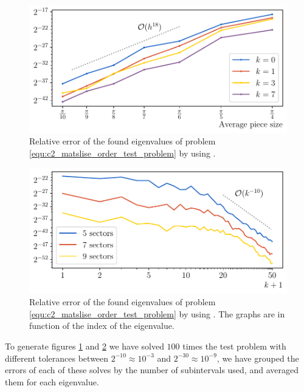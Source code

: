 \begin{figure}
    \begin{center}
        \includegraphics[width=\textwidth]{img/chapter2/matslise_h_error.pdf}
    \end{center}
    \caption{Relative error of the found eigenvalues of problem \eqref{equ:c2_matslise_order_test_problem} by using .}
    \label{fig:c2_matslise_h_error}
\end{figure}

\begin{figure}
    \begin{center}
        \includegraphics[width=\textwidth]{img/chapter2/matslise_k_error.pdf}
    \end{center}
    \caption{Relative error of the found eigenvalues of problem \eqref{equ:c2_matslise_order_test_problem} by using . The graphs are in function of the index of the eigenvalue.}
    \label{fig:c2_matslise_k_error}
\end{figure}

To generate figures \ref{fig:c2_matslise_h_error} and \ref{fig:c2_matslise_k_error} we have solved $100$ times the test problem with different tolerances between $2^{-10} \approx 10^{-3}$ and $2^{-30} \approx 10^{-9}$, we have grouped the errors of each of these solves by the number of subintervals \matslise{} used, and averaged them for each eigenvalue.

